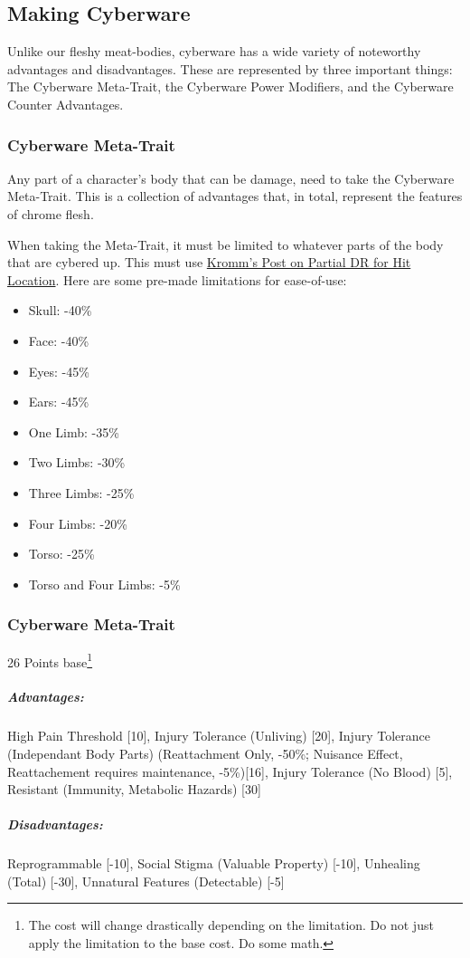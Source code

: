\begin{multicols*}{3}
	\subsection{Making Cyberware}
	
	Unlike our fleshy meat-bodies, cyberware has a wide variety of noteworthy advantages and disadvantages. These are represented by three important things: The Cyberware Meta-Trait, the Cyberware Power Modifiers, and the Cyberware Counter Advantages.
	
	\subsubsection{Cyberware Meta-Trait}\label{cyberware-meta-trait}
	
	Any part of a character's body that can be damage, need to take the Cyberware Meta-Trait. This is a collection of advantages that, in total, represent the features of chrome flesh.
	
	When taking the Meta-Trait, it must be limited to whatever parts of the body that are cybered up. This must use \textcolor{Blue}{\href{http://forums.sjgames.com/showpost.php?p=623207&postcount=1}{Kromm's Post on Partial DR for Hit Location}}. Here are some pre-made limitations for ease-of-use:
	
	\begin{itemize}
		\itemsep0em 
		\item Skull: -40\%
		\item Face: -40\%
		\item Eyes: -45\%
		\item Ears: -45\%
		\item One Limb: -35\%
		\item Two Limbs: -30\%
		\item Three Limbs: -25\%
		\item Four Limbs: -20\%
		\item Torso: -25\%
		\item Torso and Four Limbs: -5\%
	\end{itemize}
	
	\subsubsection*{Cyberware Meta-Trait}
	\begin{flushright}
		26 Points base\footnote{The cost will change drastically depending on the limitation. Do not just apply the limitation to the base cost. Do some math.}
	\end{flushright}
	\subparagraph{Advantages:}
	High Pain Threshold [10], Injury Tolerance (Unliving) [20], Injury Tolerance (Independant Body Parts) (Reattachment Only, -50\%; Nuisance Effect, Reattachement requires maintenance, -5\%)[16], Injury Tolerance (No Blood) [5], Resistant (Immunity, Metabolic Hazards) [30]
	\subparagraph{Disadvantages:}
	Reprogrammable [-10], Social Stigma (Valuable Property) [-10], Unhealing (Total) [-30], Unnatural Features (Detectable) [-5]
	

\end{multicols*}
